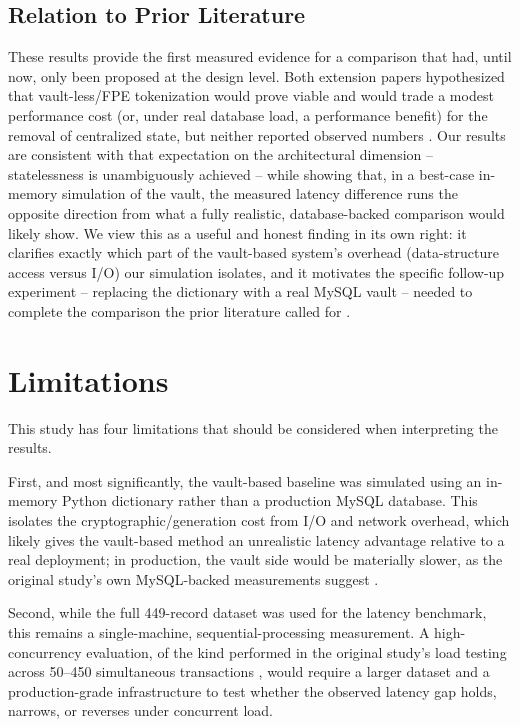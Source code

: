 \documentclass[conference]{IEEEtran}
\begin{document}
\subsection{Relation to Prior Literature}
These results provide the first measured evidence for a comparison that had, until now, only been proposed at the design level. Both extension papers hypothesized that vault-less/FPE tokenization would prove viable and would trade a modest performance cost (or, under real database load, a performance benefit) for the removal of centralized state, but neither reported observed numbers \cite{b2,b3}. Our results are consistent with that expectation on the architectural dimension -- statelessness is unambiguously achieved -- while showing that, in a best-case in-memory simulation of the vault, the measured latency difference runs the opposite direction from what a fully realistic, database-backed comparison would likely show. We view this as a useful and honest finding in its own right: it clarifies exactly which part of the vault-based system's overhead (data-structure access versus I/O) our simulation isolates, and it motivates the specific follow-up experiment -- replacing the dictionary with a real MySQL vault -- needed to complete the comparison the prior literature called for \cite{b1,b2,b3}.

\section{Limitations}
This study has four limitations that should be considered when interpreting the results.

First, and most significantly, the vault-based baseline was simulated using an in-memory Python dictionary rather than a production MySQL database. This isolates the cryptographic/generation cost from I/O and network overhead, which likely gives the vault-based method an unrealistic latency advantage relative to a real deployment; in production, the vault side would be materially slower, as the original study's own MySQL-backed measurements suggest \cite{b1}.

Second, while the full 449-record dataset was used for the latency benchmark, this remains a single-machine, sequential-processing measurement. A high-concurrency evaluation, of the kind performed in the original study's load testing across 50--450 simultaneous transactions \cite{b1}, would require a larger dataset and a production-grade infrastructure to test whether the observed latency gap holds, narrows, or reverses under concurrent load.
\end{document}
